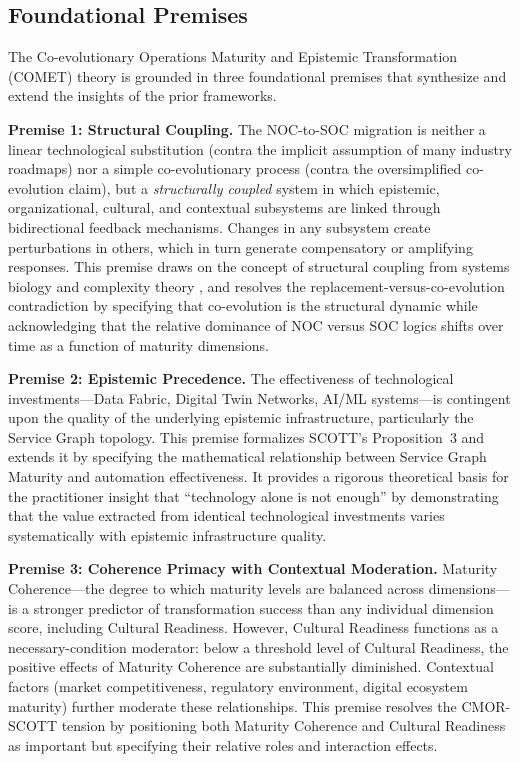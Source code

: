 \documentclass[12pt,a4paper]{article}
\begin{document}
\subsection{Foundational Premises}

The Co-evolutionary Operations Maturity and Epistemic Transformation (COMET) theory is grounded in three foundational premises that synthesize and extend the insights of the prior frameworks.

\textbf{Premise 1: Structural Coupling.} The NOC-to-SOC migration is neither a linear technological substitution (contra the implicit assumption of many industry roadmaps) nor a simple co-evolutionary process (contra the oversimplified co-evolution claim), but a \textit{structurally coupled} system in which epistemic, organizational, cultural, and contextual subsystems are linked through bidirectional feedback mechanisms. Changes in any subsystem create perturbations in others, which in turn generate compensatory or amplifying responses. This premise draws on the concept of structural coupling from systems biology and complexity theory \citep{uhl2007complexity}, and resolves the replacement-versus-co-evolution contradiction by specifying that co-evolution is the structural dynamic while acknowledging that the relative dominance of NOC versus SOC logics shifts over time as a function of maturity dimensions.

\textbf{Premise 2: Epistemic Precedence.} The effectiveness of technological investments---Data Fabric, Digital Twin Networks, AI/ML systems---is contingent upon the quality of the underlying epistemic infrastructure, particularly the Service Graph topology. This premise formalizes SCOTT's Proposition~3 and extends it by specifying the mathematical relationship between Service Graph Maturity and automation effectiveness. It provides a rigorous theoretical basis for the practitioner insight that ``technology alone is not enough'' by demonstrating that the value extracted from identical technological investments varies systematically with epistemic infrastructure quality.

\textbf{Premise 3: Coherence Primacy with Contextual Moderation.} Maturity Coherence---the degree to which maturity levels are balanced across dimensions---is a stronger predictor of transformation success than any individual dimension score, including Cultural Readiness. However, Cultural Readiness functions as a necessary-condition moderator: below a threshold level of Cultural Readiness, the positive effects of Maturity Coherence are substantially diminished. Contextual factors (market competitiveness, regulatory environment, digital ecosystem maturity) further moderate these relationships. This premise resolves the CMOR-SCOTT tension by positioning both Maturity Coherence and Cultural Readiness as important but specifying their relative roles and interaction effects.
\end{document}

